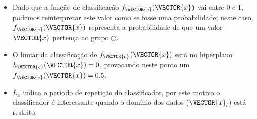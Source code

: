 \begin{tcbattention}
\begin{itemize}
\item Dado que a função de classificação $f_{\VECTOR{c}}(\VECTOR{x})$ vai entre $0$ e $1$,
podemos reinterpretar este valor como se fosse uma probabilidade;
neste caso, $f_{\VECTOR{c}}(\VECTOR{x})$ representa a probabilidade de que um valor $\VECTOR{x}$
pertença ao grupo $\bigcirc$.
\item O limiar da classificação de $f_{\VECTOR{c}}(\VECTOR{x})$ 
está no hiperplano $h_{\VECTOR{c}}(\VECTOR{x})=0$,
provocando neste ponto um $f_{\VECTOR{c}}(\VECTOR{x})=0.5$.
\item $L_x$ indica o periodo de repetição do classificador,
por este motivo o classificador é interessante quando o domínio dos dados ($\VECTOR{x}_l$) está restrito.
\end{itemize}
\end{tcbattention}

